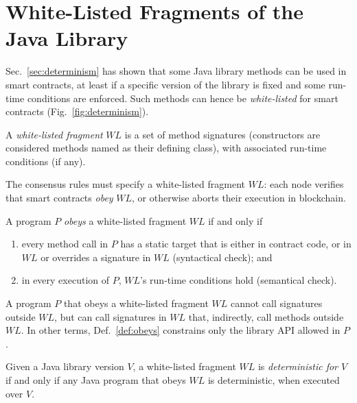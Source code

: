 \section{White-Listed Fragments of the Java Library}\label{sec:white_listing}

\newcommand{\wl}{\mathit{WL}}

Sec.~\ref{sec:determinism} has shown that some Java library methods can be used
in smart contracts, at least if a specific version of the library is fixed and some
run-time conditions are enforced. Such methods can hence be \emph{white-listed} for smart contracts
(Fig.~\ref{fig:determinism}).

\begin{definition}\label{def:white-listing}
  A \emph{white-listed fragment} $\wl$ is a set of method signatures (constructors are considered
  methods named as their defining class), with associated run-time conditions (if any).
\end{definition}
%
The consensus rules must specify a white-listed fragment $\wl$:
each node verifies that smart contracts \emph{obey} $\wl$,
or otherwise aborts their execution in blockchain.
%
\begin{definition}\label{def:obeys}
  A program $P$ \emph{obeys} a white-listed fragment $\wl$ if and only if
  \begin{enumerate}
    \item every method call
      in $P$ has a static target that is either in contract code, or
      in $\wl$ or overrides a signature in $\wl$
      (syntactical check); and
    \item in every execution of $P$, $\wl$'s run-time conditions hold (semantical check).
  \end{enumerate}
\end{definition}
%
A program $P$ that obeys a white-listed fragment $\wl$ cannot call signatures outside
$\wl$, but can call signatures in $\wl$ that, indirectly, call methods outside $\wl$.
In other terms, Def.~\ref{def:obeys} constrains only the library API allowed in $P$.
%
\begin{definition}\label{def:deterministic}
  Given a Java library version $V$, a white-listed fragment $\wl$ is
  \emph{deterministic for $V$}
  if and only if any Java program that obeys $\wl$
  is deterministic, when executed over $V$.
\end{definition}

